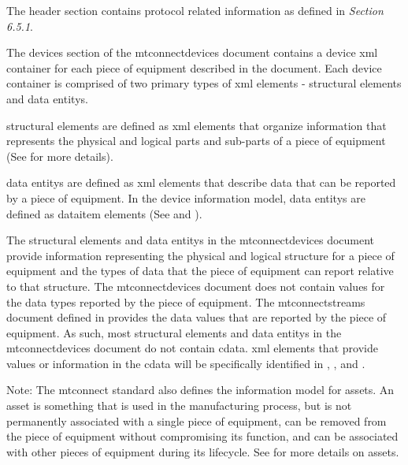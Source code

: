 \documentclass{mtconnect}	%
\begin{document}
The \gls{header} section contains protocol related information as defined in  \textit{Section 6.5.1}.

The \gls{devices} section of the \gls{mtconnectdevices} document contains a \gls{device} \gls{xml} container for each piece of equipment described in the document.   Each \gls{device} container is comprised of two primary types of \gls{xml} elements - \glspl{structural element} and \glspl{data entity}.  

\glspl{structural element} are defined as \gls{xml} elements that organize information that represents the physical and logical parts and sub-parts of a piece of equipment (See  for more details).  

\glspl{data entity} are defined as \gls{xml} elements that describe data that can be reported by a piece of equipment.  In the \gls{device information model}, \glspl{data entity} are defined as \gls{dataitem} elements (See  and ).

The \glspl{structural element} and \glspl{data entity} in the \gls{mtconnectdevices} document provide information representing the physical and logical structure for a piece of equipment and the types of data that the piece of equipment can report relative to that structure.   The \gls{mtconnectdevices} document does not contain values for the data types reported by the piece of equipment.  The \gls{mtconnectstreams} document defined in  provides the data values that are reported by the piece of equipment.   As such, most \glspl{structural element} and \glspl{data entity} in the \gls{mtconnectdevices} document do not contain \gls{cdata}.  \gls{xml} elements that provide values or information in the \gls{cdata} will be specifically identified in , , and .

\begin{note}
Note:  The \gls{mtconnect standard} also defines the information model for \glspl{asset}.  An \gls{asset} is something that is used in the manufacturing process, but is not permanently associated with a single piece of equipment, can be removed from the piece of equipment without compromising its function, and can be associated with other pieces of equipment during its lifecycle.  See  for more details on \glspl{asset}.

\end{note}
\end{document}
